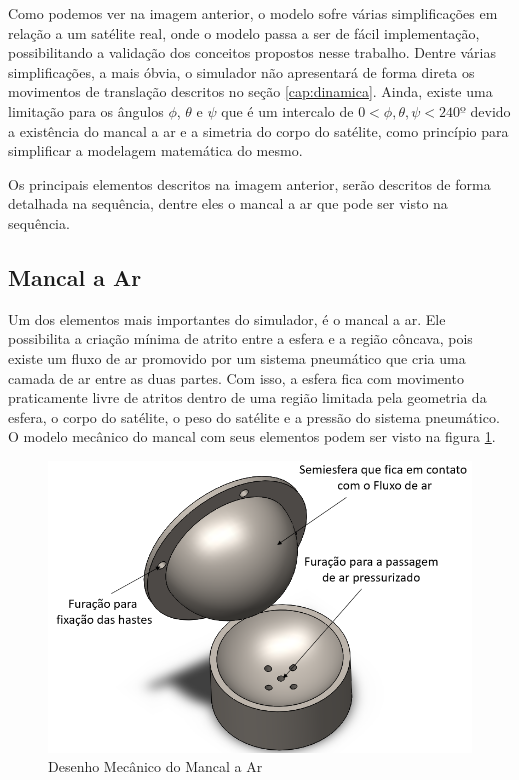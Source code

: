  Como podemos ver na imagem anterior, o modelo sofre várias simplificações em relação a um satélite real, onde o modelo passa a ser de fácil implementação, possibilitando a validação dos conceitos propostos nesse trabalho. Dentre várias simplificações, a mais óbvia, o simulador não apresentará de forma direta os movimentos de translação descritos no seção \ref{cap:dinamica}. Ainda, existe uma limitação para os ângulos $\phi$, $\theta$ e $\psi$ que é um intercalo de $0<\phi, \theta, \psi<240º$ devido a existência do mancal a ar e a simetria do corpo do satélite, como princípio para simplificar a modelagem matemática do mesmo.

Os principais elementos descritos na imagem anterior, serão descritos de forma detalhada na sequência, dentre eles o mancal a ar que pode ser visto na sequência.



\subsection{Mancal a Ar}

Um dos elementos mais importantes do simulador, é o mancal a ar. Ele possibilita a criação mínima de atrito entre a esfera e a região côncava, pois existe um fluxo de ar promovido por um sistema pneumático que cria uma camada de ar entre as duas partes. Com isso, a esfera fica com movimento praticamente livre de atritos dentro de uma região limitada pela geometria da esfera, o corpo do satélite, o peso do satélite e a pressão do sistema pneumático. O modelo mecânico do mancal com seus elementos podem ser visto na figura \ref{fig:base_desenho}.

\begin{figure}[H]
  \caption{Desenho Mecânico do Mancal a Ar}
  \begin{center}
      \includegraphics[scale=.45]{img/base_desenho}
  \end{center}
  \label{fig:base_desenho}
\end{figure}

